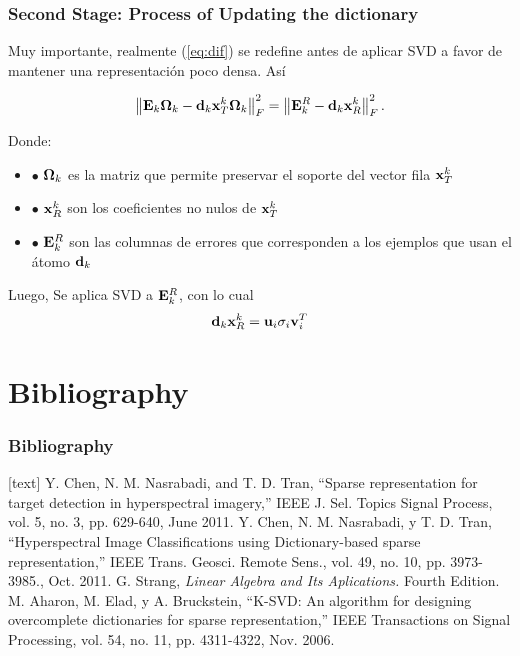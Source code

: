 \documentclass[spanish,xcolor=dvipsnames]{beamer}
\begin{document}
\begin{frame}
	\frametitle{Second Stage: Process of Updating the dictionary}
	
Muy importante, realmente (\ref{eq:dif}) se redefine antes de aplicar SVD a favor de mantener una representación poco densa. Así 

	\begin{equation}
		\nonumber \left \| {\bf E}_k {\bf \Omega}_k - {\bf d}_k {\bf x}_T^k {\bf \Omega}_k \right \|_F^2
		= \left \| {\bf E}_k^R - {\bf d}_k {\bf x}_R^k \right \|_F^2.		
	\end{equation} 

Donde:
	\begin {itemize}
		\item [\color {black} \bf $\bullet$]  ${\bf \Omega}_k$ es la matriz que permite preservar el soporte del vector fila ${\bf x}_T^k$
		\item [\color {black} \bf $\bullet$]  ${\bf x}_R^k$ son los coeficientes no nulos de ${\bf x}_T^k$
		\item [\color {black} \bf $\bullet$] $ {\bf E}_k^R$ son las columnas de errores que corresponden a los ejemplos que usan el átomo ${\bf d}_k$
	\end{itemize}

Luego, Se aplica SVD a ${\bf E}_k^R$, con lo cual	
	\begin{equation}
		\nonumber {\bf d}_k {\bf x}_R^k =  {\bf u}_i {\sigma}_i {\bf v}_i^T  
	\end {equation}

\end{frame}

    \section{Bibliography}
    \begin{frame}
        \frametitle{Bibliography}
        \begin{thebibliography}{9}\small
            [text]
            Y. Chen, N. M. Nasrabadi, and T. D. Tran, “Sparse representation for target detection in hyperspectral imagery,” IEEE J. Sel. Topics Signal Process, vol. 5, no. 3, pp. 629-640, June 2011.
            Y. Chen, N. M. Nasrabadi, y T. D. Tran, “Hyperspectral Image Classifications using Dictionary-based sparse representation,” IEEE Trans. Geosci. Remote Sens., vol. 49, no. 10, pp. 3973-3985., Oct. 2011.
             G. Strang, \textit{Linear Algebra and Its Aplications.} Fourth Edition. 
	  M. Aharon, M. Elad, y A. Bruckstein, “K-SVD: An algorithm for designing overcomplete dictionaries for sparse representation,” IEEE Transactions on Signal Processing, vol. 54, no. 11, pp. 4311-4322, Nov. 2006.
        \end{thebibliography}
    \end{frame}
\end{document}
